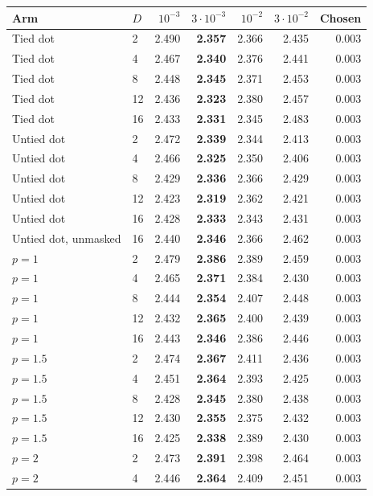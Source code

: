 \begin{longtable}{llrrrrr}
\toprule
Arm & $D$ & $10^{-3}$ & $3\cdot10^{-3}$ & $10^{-2}$ & $3\cdot10^{-2}$ & Chosen \\
\midrule
\endhead
Tied dot & 2 & 2.490 & \textbf{2.357} & 2.366 & 2.435 & 0.003 \\
Tied dot & 4 & 2.467 & \textbf{2.340} & 2.376 & 2.441 & 0.003 \\
Tied dot & 8 & 2.448 & \textbf{2.345} & 2.371 & 2.453 & 0.003 \\
Tied dot & 12 & 2.436 & \textbf{2.323} & 2.380 & 2.457 & 0.003 \\
Tied dot & 16 & 2.433 & \textbf{2.331} & 2.345 & 2.483 & 0.003 \\
Untied dot & 2 & 2.472 & \textbf{2.339} & 2.344 & 2.413 & 0.003 \\
Untied dot & 4 & 2.466 & \textbf{2.325} & 2.350 & 2.406 & 0.003 \\
Untied dot & 8 & 2.429 & \textbf{2.336} & 2.366 & 2.429 & 0.003 \\
Untied dot & 12 & 2.423 & \textbf{2.319} & 2.362 & 2.421 & 0.003 \\
Untied dot & 16 & 2.428 & \textbf{2.333} & 2.343 & 2.431 & 0.003 \\
Untied dot, unmasked & 16 & 2.440 & \textbf{2.346} & 2.366 & 2.462 & 0.003 \\
$p=1$ & 2 & 2.479 & \textbf{2.386} & 2.389 & 2.459 & 0.003 \\
$p=1$ & 4 & 2.465 & \textbf{2.371} & 2.384 & 2.430 & 0.003 \\
$p=1$ & 8 & 2.444 & \textbf{2.354} & 2.407 & 2.448 & 0.003 \\
$p=1$ & 12 & 2.432 & \textbf{2.365} & 2.400 & 2.439 & 0.003 \\
$p=1$ & 16 & 2.443 & \textbf{2.346} & 2.386 & 2.446 & 0.003 \\
$p=1.5$ & 2 & 2.474 & \textbf{2.367} & 2.411 & 2.436 & 0.003 \\
$p=1.5$ & 4 & 2.451 & \textbf{2.364} & 2.393 & 2.425 & 0.003 \\
$p=1.5$ & 8 & 2.428 & \textbf{2.345} & 2.380 & 2.438 & 0.003 \\
$p=1.5$ & 12 & 2.430 & \textbf{2.355} & 2.375 & 2.432 & 0.003 \\
$p=1.5$ & 16 & 2.425 & \textbf{2.338} & 2.389 & 2.430 & 0.003 \\
$p=2$ & 2 & 2.473 & \textbf{2.391} & 2.398 & 2.464 & 0.003 \\
$p=2$ & 4 & 2.446 & \textbf{2.364} & 2.409 & 2.451 & 0.003 \\

\end{longtable}
